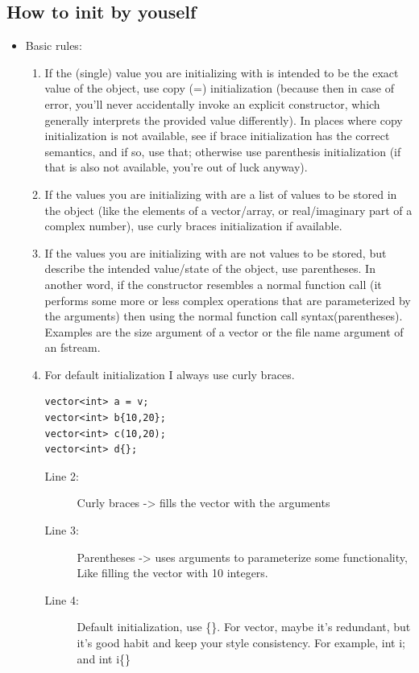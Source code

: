 \documentclass[a4paper,11pt,twoside]{book}
\begin{document}
\subsection{How to init by youself}
\begin{itemize}
	
		\item Basic rules:
	\begin{enumerate}
		\item If the (single) value you are initializing with is intended to be the exact value of the object, use copy (=) initialization (because then in case of error, you'll never accidentally invoke an explicit constructor, which generally interprets the provided value differently). In places where copy initialization is not available, see if brace initialization has the correct semantics, and if so, use that; otherwise use parenthesis initialization (if that is also not available, you're out of luck anyway).
		
		\item If the values you are initializing with are a list of values to be stored in the object (like the elements of a vector/array, or real/imaginary part of a complex number), use curly braces initialization if available. 
		
		\item If the values you are initializing with are not values to be stored, but describe the intended value/state of the object, use parentheses. In another word, if the constructor resembles a normal function call (it performs some more or less complex operations that are parameterized by the arguments) then using the normal function call syntax(parentheses). Examples are the size argument of a vector or the file name argument of an fstream. 
		
		\item For default initialization I always use curly braces.
\begin{lstlisting}
vector<int> a = v;
vector<int> b{10,20};
vector<int> c(10,20);
vector<int> d{};
\end{lstlisting}
		\begin{description}
			\item[Line 2:] Curly braces -> fills the vector with the arguments
			\item[Line 3:] Parentheses -> uses arguments to parameterize some functionality, Like filling the vector with 10 integers.
														   
			\item[Line 4:] Default initialization, use \{\}. For vector, maybe it's redundant, but it's good habit and keep your style consistency. For example, int i; and int i\{\} 
		\end{description}
	\end{enumerate}


\end{itemize}
\end{document}

